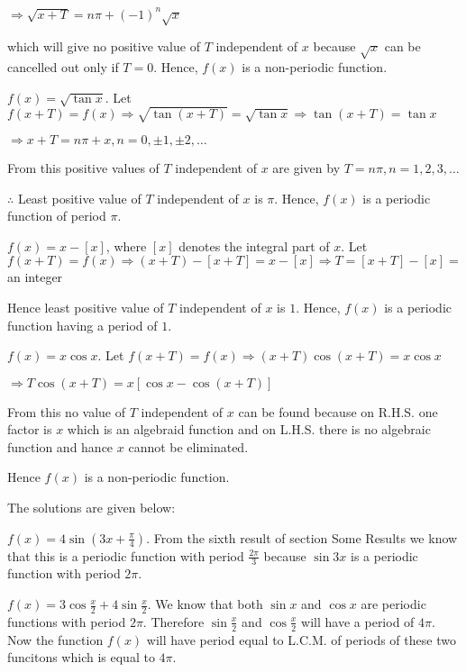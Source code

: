      $\Rightarrow \sqrt{x + T} = n\pi + (-1)^n\sqrt{x}$

     which will give no positive value of $T$ independent of $x$ because $\sqrt{x}$ can
     be cancelled out only if $T = 0$. Hence, $f(x)$ is a non-periodic function.

   \item $f(x) = \sqrt{\tan x}$. Let $f(x + T) = f(x) \Rightarrow \sqrt{\tan(x + T)} = \sqrt{\tan
       x} \Rightarrow \tan(x + T) = \tan x$

     $\Rightarrow x + T = n\pi + x, n = 0, \pm1, \pm2, \ldots$

     From this positive values of $T$ independent of $x$ are given by $T = n\pi, n = 1,
     2, 3, \ldots$

     $\therefore$ Least positive value of $T$ independent of $x$ is $\pi$. Hence,
     $f(x)$ is a periodic function of period $\pi$.

   \item $f(x) = x - [x]$, where $[x]$ denotes the integral part of $x$. Let
     $f(x + T) = f(x) \Rightarrow (x + T) - [x + T] = x - [x] \Rightarrow T = [x + T] - [x] =$ an
     integer

     Hence least positive value of $T$ independent of $x$ is $1$. Hence, $f(x)$
     is a periodic function having a period of $1$.

   \item $f(x) = x\cos x$. Let $f(x + T) = f(x) \Rightarrow (x + T)\cos(x + T) = x\cos x$

     $\Rightarrow T\cos(x + T) = x[\cos x - \cos(x + T)]$

     From this no value of $T$ independent of $x$ can be found because on R.H.S. one factor
     is $x$ which is an algebraid function and on L.H.S. there is no algebraic function and hance
     $x$ cannot be eliminated.

     Hence $f(x)$ is a non-periodic function.
     \stopitemize
\item The solutions are given below:
  \startitemize[i]
\item $f(x) = 4\sin\left(3x + \frac{\pi}{4}\right)$. From the sixth result of section Some Results we
  know that this is a periodic function with period $\frac{2\pi}{3}$ because $\sin3x$ is a
  periodic function with period $2\pi$.

\item $f(x) = 3\cos\frac{x}{2} + 4\sin\frac{x}{2}$. We know that both $\sin x$ and $\cos
  x$ are periodic functions with period $2\pi$. Therefore $\sin\frac{x}{2}$ and
  $\cos\frac{x}{2}$ will have a period of $4\pi$. Now the function $f(x)$ will have
  period equal to L.C.M. of periods of these two funcitons which is equal to $4\pi$.

